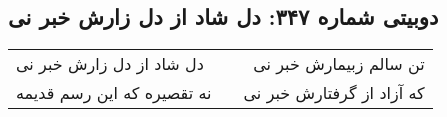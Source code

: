 \begin{center}
\section*{دوبیتی شماره ۳۴۷: دل شاد از دل زارش خبر نی}
\label{sec:347}
\begin{longtable}{l p{0.5cm} r}
دل شاد از دل زارش خبر نی
&&
تن سالم زبیمارش خبر نی
\\
نه تقصیره که این رسم قدیمه
&&
که آزاد از گرفتارش خبر نی
\\
\end{longtable}
\end{center}
